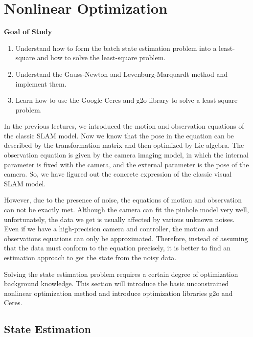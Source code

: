 \chapter{Nonlinear Optimization}
\label{cpt:6}
\begin{mdframed}  
	\textbf{Goal of Study}
	\begin{enumerate}[labelindent=0em,leftmargin=1.5em]
		\item Understand how to form the batch state estimation problem into a least-square and how to solve the least-square problem.
		\item Understand the Gauss-Newton and Levenburg-Marquardt method and implement them.
		\item Learn how to use the Google Ceres and g2o library to solve a least-square problem.
	\end{enumerate}
\end{mdframed} 

In the previous lectures, we introduced the motion and observation equations of the classic SLAM model. Now we know that the pose in the equation can be described by the transformation matrix and then optimized by Lie algebra. The observation equation is given by the camera imaging model, in which the internal parameter is fixed with the camera, and the external parameter is the pose of the camera. So, we have figured out the concrete expression of the classic visual SLAM model.

However, due to the presence of noise, the equations of motion and observation can not be exactly met. Although the camera can fit the pinhole model very well, unfortunately, the data we get is usually affected by various unknown noises. Even if we have a high-precision camera and controller, the motion and observations equations can only be approximated. Therefore, instead of assuming that the data must conform to the equation precisely, it is better to find an estimation approach to get the state from the noisy data.

Solving the state estimation problem requires a certain degree of optimization background knowledge. This section will introduce the basic unconstrained nonlinear optimization method and introduce optimization libraries g2o and Ceres.

\newpage


\newpage
\section{State Estimation}
